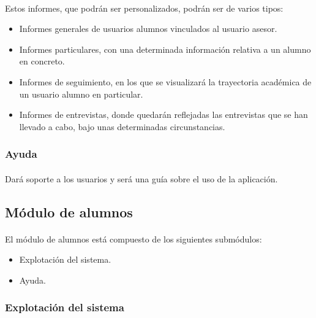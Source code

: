       \paragraph{}Estos informes, que podrán ser personalizados, podrán ser
      de varios tipos:

      \begin{itemize}
       \item Informes generales de usuarios alumnos vinculados al usuario
             asesor.
       \item Informes particulares, con una determinada información relativa a
             un alumno en concreto.
       \item Informes de seguimiento, en los que se visualizará la trayectoria
             académica de un usuario alumno en particular.
       \item Informes de entrevistas, donde quedarán reflejadas las entrevistas
             que se han llevado a cabo, bajo unas determinadas circunstancias.
      \end{itemize}

      \subsubsection{Ayuda}

      \paragraph{}Dará soporte a los usuarios y será una guía sobre el uso de
      la aplicación.

   \subsection{Módulo de alumnos}\label{modAlumnos}

      \paragraph{}El módulo de alumnos está compuesto de los siguientes
      submódulos:

      \begin{itemize}
       \item Explotación del sistema.
       \item Ayuda.
      \end{itemize}

      \subsubsection{Explotación del sistema}

